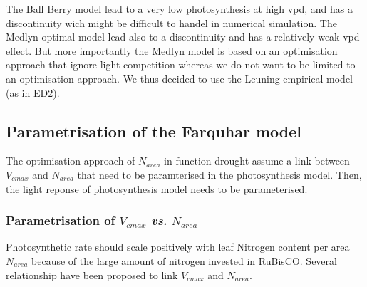 \documentclass[a4paper,11pt]{article}
\begin{document}
\clearpage

The Ball Berry model lead to a very low photosynthesis at high vpd,
and has a discontinuity wich might be difficult to handel in numerical
simulation. The Medlyn optimal model lead also to a
discontinuity and has a relatively weak vpd effect. But more
importantly the Medlyn model is based on an optimisation approach that
ignore light competition whereas we do not want to be limited to an
optimisation approach. We thus decided to use the Leuning empirical
model (as in ED2). 




\pagebreak


\subsection{Parametrisation of the Farquhar model}

The optimisation approach of $N_{area}$ in function drought assume a
link between $V_{cmax}$ and $N_{area}$ that need to be paramterised in
the photosynthesis model. Then, the light reponse of photosynthesis model needs to be parameterised.

\subsubsection{Parametrisation of $V_{cmax}$ \textit{vs.} $N_{area}$}

Photosynthetic rate should scale positively with leaf Nitrogen content
per area $N_{area}$ because of the large amount of nitrogen invested in RuBisCO. Several relationship have been proposed to link $V_{cmax}$ and $N_{area}$.
\end{document}
